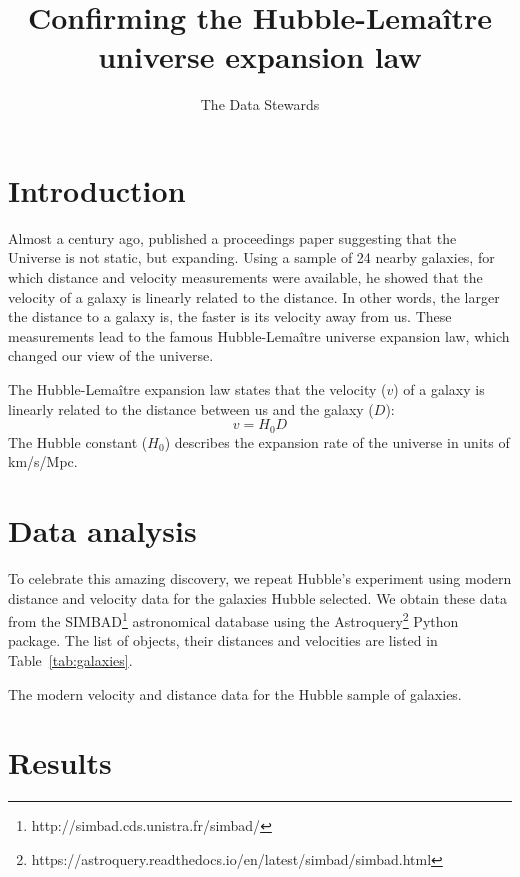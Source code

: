 \documentclass[10pt,twocolumn]{article}
\title{Confirming the Hubble-Lema\^itre universe expansion law}
\author{The Data Stewards}
\begin{document}
\maketitle

\section{Introduction}

Almost a century ago, \citet{Hubble1929} published a proceedings
paper suggesting that the Universe is not static, but expanding.
Using a sample of 24 nearby galaxies, for which distance and 
velocity measurements were available, he showed that the velocity
of a galaxy is linearly related to the distance. In other words,
the larger the distance to a galaxy is, the faster is its velocity
away from us. These measurements lead to the famous Hubble-Lema\^itre 
universe expansion law, which changed our view of the universe.

The Hubble-Lema\^itre expansion law states that the velocity ($v$)
of a galaxy is linearly related to the distance between us and the
galaxy ($D$):
\begin{equation}
v = H_0 D
\end{equation}
The Hubble constant ($H_0$) describes the expansion rate of the 
universe in units of km/s/Mpc.

\section{Data analysis}

To celebrate this amazing discovery, we repeat Hubble's experiment
using modern distance and velocity data for the galaxies Hubble 
selected. We obtain these data from the SIMBAD\footnote{http://simbad.cds.unistra.fr/simbad/}
astronomical database using the Astroquery\footnote{https://astroquery.readthedocs.io/en/latest/simbad/simbad.html}
Python package. The list of objects, their distances and velocities 
are listed in Table~\ref{tab:galaxies}. 

\begin{table}
\caption{The modern velocity and distance data for the Hubble 
sample of galaxies.}
\label{tab:galaxies}
\end{table}

\section{Results}
\end{document}
